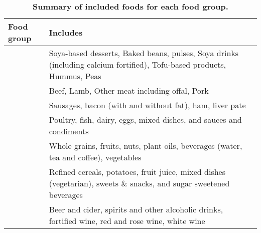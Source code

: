 \begin{table*}[!t]
\caption*{{\small \textbf{Summary of included foods for each food group.}}}\label{tab-food-group}
\begin{tabular*}{1\linewidth}{@{\extracolsep{\fill}}>{\raggedright\arraybackslash}p{}>{\raggedright\arraybackslash}p{}}
\toprule
\textbf{Food group} & \textbf{Includes} \\
\midrule\addlinespace[2.5pt]
{\bfseries Legumes} & Soya-based desserts, Baked beans, pulses, Soya drinks (including calcium fortified),
  Tofu-based products, Hummus, Peas \\
{\bfseries Red meat} & Beef, Lamb, Other meat including offal, Pork \\
{\bfseries Processed meat} & Sausages, bacon (with and without fat), ham, liver pate \\
{\bfseries Animal-based foods} & Poultry, fish, dairy, eggs, mixed dishes, and sauces and condiments \\
{\bfseries Healthy plant-based foods} & Whole grains, fruits, nuts, plant oils, beverages (water, tea and coffee), vegetables \\
{\bfseries Unhealthy plant-based foods} & Refined cereals, potatoes, fruit juice, mixed dishes (vegetarian), sweets \& snacks, and sugar sweetened beverages \\
{\bfseries Alcoholic beverages} & Beer and cider, spirits and other alcoholic drinks, fortified wine, red and rose wine, white wine \\
\bottomrule
\end{tabular*}
\end{table*}
